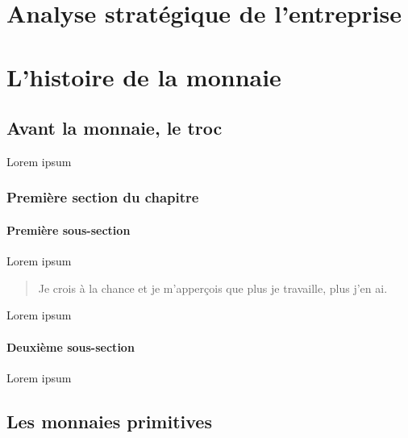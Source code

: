 \documentclass{bredele} %
\begin{document}

    \clearemptydoublepage

    \clearemptydoublepage
    \mainmatter %

    \clearemptydoublepage
    \part[Analyse stratégique de l'entreprise]{Analyse stratégique de l'entreprise}

    \part[L'histoire de la monnaie]{L'histoire de la monnaie}

    \chapter[Avant la monnaie]{Avant la monnaie, le troc}

    Lorem ipsum

    \section{Première section du chapitre}

    \subsection{Première sous-section}

    Lorem ipsum

    \begin{quote}
    Je crois à la chance et je m'apperçois que plus je travaille, plus j'en ai.
    \end{quote}

    Lorem ipsum

    \subsection{Deuxième sous-section}

    Lorem ipsum

    \clearemptydoublepage

    \chapter[Les monnaies primitives]{Les monnaies primitives}
\end{document}
